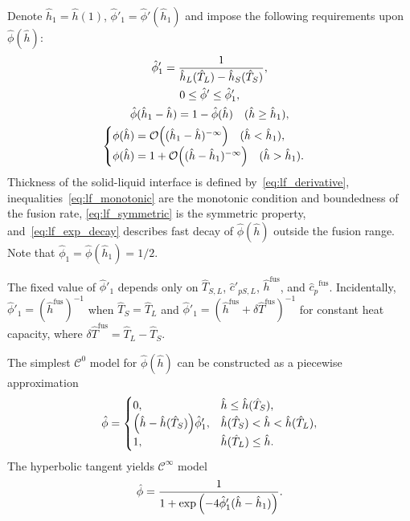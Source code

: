 \documentclass{article}
\newcommand{\fusion}[1]{{#1}^\mathrm{fus}}
\newcommand{\Hh}{\hat{h}}
\newcommand{\HT}{\hat{T}}
\newcommand{\Hc}{\hat{c}}
\newcommand{\Hphi}{\hat{\phi}}
\begin{document}
Denote \(\Hh_1 = \Hh(1)\), \(\Hphi'_1 = \Hphi'(\Hh_1)\) and
impose the following requirements upon \(\Hphi(\Hh)\):
\begin{gather}
    \Hphi'_1 = \frac1{\Hh_L(\HT_L)-\Hh_S(\HT_S)}, \label{eq:lf_derivative}\\
    0 \leq \Hphi' \leq \Hphi'_1, \label{eq:lf_monotonic}\\
    \Hphi(\Hh_1 - \Hh) = 1-\Hphi(\Hh) \quad (\Hh\geq\Hh_1), \label{eq:lf_symmetric}\\
    \begin{cases}
	    \phi(\Hh) = \order{(\Hh_1-\Hh)^{-\infty}} \quad (\Hh < \Hh_1), \\
	    \phi(\Hh) = 1+\order{(\Hh-\Hh_1)^{-\infty}} \quad (\Hh > \Hh_1).
	\end{cases}\label{eq:lf_exp_decay}
\end{gather}
Thickness of the solid-liquid interface is defined by~\eqref{eq:lf_derivative},
inequalities~\eqref{eq:lf_monotonic} are the monotonic condition and boundedness of the fusion rate,
\eqref{eq:lf_symmetric} is the symmetric property,
and~\eqref{eq:lf_exp_decay} describes fast decay of \(\Hphi(\Hh)\) outside the fusion range.
Note that \(\Hphi_1 = \Hphi(\Hh_1) = 1/2\).

The fixed value of \(\Hphi'_1\) depends only on \(\HT_{S,L}\), \(\Hc'_{pS,L}\), \(\fusion{\Hh}\), and \(\fusion{\Hc_p}\).
Incidentally, \(\Hphi'_1 = (\fusion{\Hh})^{-1}\) when \(\HT_S=\HT_L\)
and \(\Hphi'_1 = (\fusion{\Hh}+\delta\fusion{\HT})^{-1}\) for constant heat capacity,
where \(\delta\fusion{\HT} = \HT_L - \HT_S\).

The simplest \(\mathcal{C}^0\) model for \(\Hphi(\Hh)\) can be constructed as a piecewise approximation
\begin{equation}\label{eq:lf_piecewise}
	\Hphi = \begin{cases}
        0,                                            & \Hh \leq \Hh(\HT_S), \\
        \qty(\Hh-\Hh(\HT_S))\Hphi'_1, & \Hh(\HT_S) < \Hh < \Hh(\HT_L), \\
        1,                                            & \Hh(\HT_L) \leq \Hh.
    \end{cases}
\end{equation}
The hyperbolic tangent yields \(\mathcal{C}^\infty\) model
\begin{equation}\label{eq:lf_tanh}
	\Hphi = \frac1{1+\exp\qty(-4\Hphi'_1(\Hh-\Hh_1))}.
\end{equation}
\end{document}
